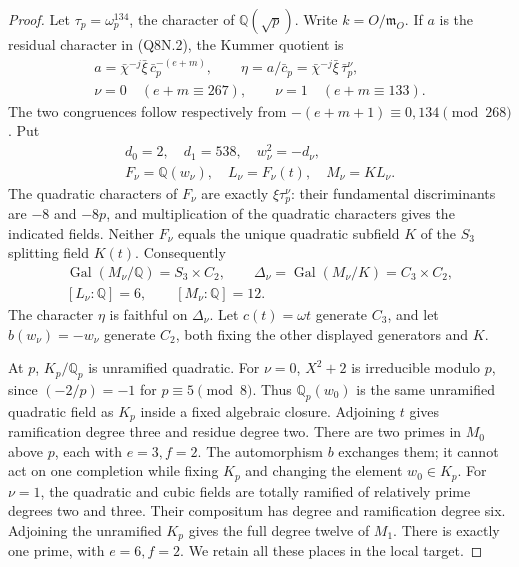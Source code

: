 \begin{proof}
Let $\tau_p=\omega_p^{134}$, the character of $\mathbb Q(\sqrt p)$.
Write $k=O/\mathfrak m_O$.
If $a$ is the residual character in (Q8N.2), the Kummer quotient is
\[
 \begin{gathered}
 a=\bar\chi^{-j}\bar\xi\,\bar c_p^{-(e+m)},\qquad
 \eta=a/\bar c_p=\bar\chi^{-j}\bar\xi\,\bar\tau_p^{\nu},\\
 \nu=0\quad(e+m\equiv267),\qquad
 \nu=1\quad(e+m\equiv133).
 \end{gathered}
 \tag{Q8N.4}
\]
The two congruences follow respectively from
$-(e+m+1)\equiv0,134\pmod{268}$.
Put
\[
 \begin{gathered}
 d_0=2,\quad d_1=538,\quad w_\nu^2=-d_\nu,\\
 F_\nu=\mathbb Q(w_\nu),\quad L_\nu=F_\nu(t),\quad M_\nu=KL_\nu.
 \end{gathered}
 \tag{Q8N.5}
\]
The quadratic characters of $F_\nu$ are exactly
$\xi\tau_p^\nu$: their fundamental discriminants are $-8$ and
$-8p$, and multiplication of the quadratic characters gives
the indicated fields.
Neither $F_\nu$ equals the unique quadratic subfield $K$ of
the $S_3$ splitting field $K(t)$.
Consequently
\[
 \begin{gathered}
 \operatorname{Gal}(M_\nu/\mathbb Q)=S_3\times C_2,\qquad
 \Delta_\nu=\operatorname{Gal}(M_\nu/K)=C_3\times C_2,\\
 [L_\nu:\mathbb Q]=6,\qquad[M_\nu:\mathbb Q]=12.
 \end{gathered}
 \tag{Q8N.6}
\]
The character $\eta$ is faithful on $\Delta_\nu$.
Let $c(t)=\omega t$ generate $C_3$, and let $b(w_\nu)=-w_\nu$
generate $C_2$, both fixing the other displayed generators and $K$.

At $p$, $K_p/\mathbb Q_p$ is unramified quadratic.
For $\nu=0$, $X^2+2$ is irreducible modulo $p$, since
$(-2/p)=-1$ for $p\equiv5\pmod8$.
Thus $\mathbb Q_p(w_0)$ is the same unramified quadratic field
as $K_p$ inside a fixed algebraic closure.
Adjoining $t$ gives ramification degree three and residue degree two.
There are two primes in $M_0$ above $p$, each with $e=3,f=2$.
The automorphism $b$ exchanges them; it cannot act on one completion
while fixing $K_p$ and changing the element $w_0\in K_p$.
For $\nu=1$, the quadratic and cubic fields are totally ramified
of relatively prime degrees two and three.
Their compositum has degree and ramification degree six.
Adjoining the unramified $K_p$ gives the full degree twelve of $M_1$.
There is exactly one prime, with $e=6,f=2$.
We retain all these places in the local target.


\end{proof}
